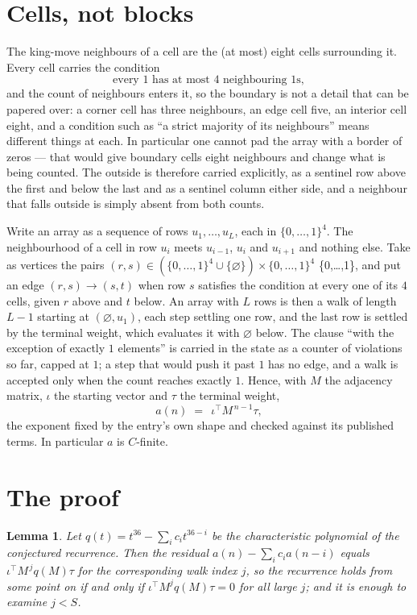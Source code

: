 \documentclass[11pt,a4paper]{article}
\theoremstyle{plain}
\newtheorem{lemma}[theorem]{Lemma}
\theoremstyle{definition}
\begin{document}
\section{Cells, not blocks}

The king-move neighbours of a cell are the (at most) eight cells surrounding it. Every cell
carries the condition
\[
\text{every }1\text{ has at most }4\text{ neighbouring }1\text{s},
\]
and the count of neighbours enters it, so the boundary is not a detail that can be papered
over: a corner cell has three neighbours, an edge cell five, an interior cell eight, and a
condition such as ``a strict majority of its neighbours'' means different things at each. In
particular one cannot pad the array with a border of zeros --- that would give boundary cells
eight neighbours and change what is being counted. The outside is therefore carried
explicitly, as a sentinel row above the first and below the last and as a sentinel column
either side, and a neighbour that falls outside is simply absent from both counts.

Write an array as a sequence of rows $u_1,\dots,u_L$, each in
$\{0,\dots,1\}^{4}$. The neighbourhood of a cell in row $u_i$ meets $u_{i-1}$,
$u_i$ and $u_{i+1}$ and nothing else. Take as vertices the pairs
$(r,s)\in(\{0,\dots,1\}^{4}\cup\{\varnothing\})\times\{0,\dots,1\}^{4}$ \times \{0,\dots,1\},
and put an edge $(r,s)\to(s,t)$ when row $s$ satisfies the condition at every one of its
$4$ cells, given $r$ above and $t$ below. An array with $L$ rows is then a walk of length
$L-1$ starting at $(\varnothing,u_1)$, each step settling one row, and the last row is
settled by the terminal weight, which evaluates it with $\varnothing$ below. The clause ``with the exception of exactly $1$ elements'' is carried in
the state as a counter of violations so far, capped at $1$; a step that would push it past
$1$ has no edge, and a walk is accepted only when the count reaches exactly $1$. Hence,
with $M$ the adjacency matrix, $\iota$ the starting vector and $\tau$ the terminal weight,
\[
a(n)\;=\;\,\iota^{\!\top}M^{\,n-1}\tau ,
\]
the exponent fixed by the entry's own shape and checked against its published terms. In
particular $a$ is $C$-finite.

\section{The proof}

\begin{lemma}\label{lem:crit}
Let $q(t)=t^{36}-\sum_i c_it^{36-i}$ be the characteristic polynomial of the
conjectured recurrence. Then the residual $a(n)-\sum_ic_ia(n-i)$ equals
$\iota^{\!\top}M^{\,j}q(M)\tau$ for the corresponding walk index $j$, so the
recurrence holds from some point on if and only if $\iota^{\!\top}M^{j}q(M)\tau=0$ for all
large $j$; and it is enough to examine $j<S$.
\end{lemma}
\end{document}
